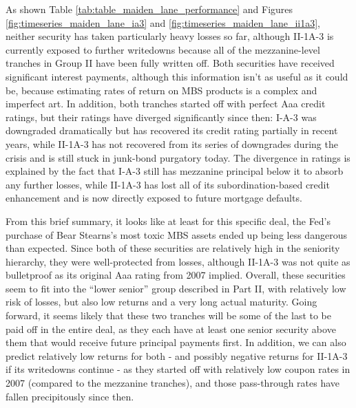 \documentclass[12pt]{article}
\begin{document}
As shown Table \ref{tab:table_maiden_lane_performance} and Figures \ref{fig:timeseries_maiden_lane_ia3} and \ref{fig:timeseries_maiden_lane_ii1a3}, neither security has taken particularly heavy losses so far, although II-1A-3 is currently exposed to further writedowns because all of the mezzanine-level tranches in Group II have been fully written off. Both securities have received significant interest payments, although this information isn’t as useful as it could be, because estimating rates of return on MBS products is a complex and imperfect art. In addition, both tranches started off with perfect Aaa credit ratings, but their ratings have diverged significantly since then: I-A-3 was downgraded dramatically but has recovered its credit rating partially in recent years, while II-1A-3 has not recovered from its series of downgrades during the crisis and is still stuck in junk-bond purgatory today. The divergence in ratings is explained by the fact that I-A-3 still has mezzanine principal below it to absorb any further losses, while II-1A-3 has lost all of its subordination-based credit enhancement and is now directly exposed to future mortgage defaults.

From this brief summary, it looks like at least for this specific deal, the Fed’s purchase of Bear Stearns’s most toxic MBS assets ended up being less dangerous than expected. Since both of these securities are relatively high in the seniority hierarchy, they were well-protected from losses, although II-1A-3 was not quite as bulletproof as its original Aaa rating from 2007 implied. Overall, these securities seem to fit into the “lower senior” group described in Part II, with relatively low risk of losses, but also low returns and a very long actual maturity. Going forward, it seems likely that these two tranches will be some of the last to be paid off in the entire deal, as they each have at least one senior security above them that would receive future principal payments first. In addition, we can also predict relatively low returns for both - and possibly negative returns for II-1A-3 if its writedowns continue - as they started off with relatively low coupon rates in 2007 (compared to the mezzanine tranches), and those pass-through rates have fallen precipitously since then.
\end{document}
